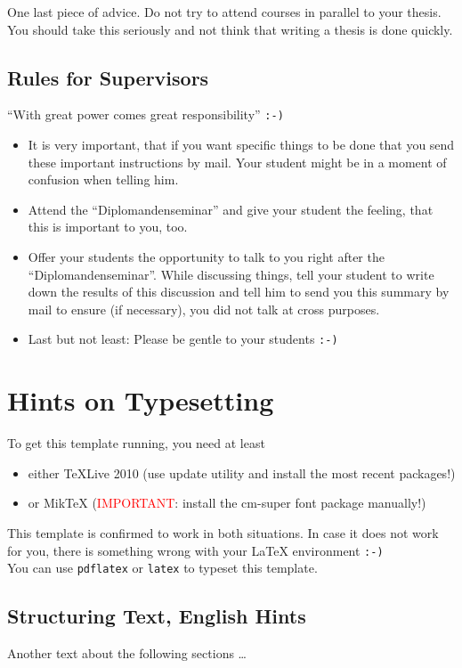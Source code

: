 One last piece of advice. Do not try to attend courses in parallel to your thesis. You should take this seriously and not think that writing a thesis is done quickly.

\subsection{Rules for Supervisors}
\enquote{With great power comes great responsibility} \texttt{:-)}

\begin{itemize}
\item It is very important, that if you want specific things to be done that you send these important instructions by mail. Your student might be in a moment of confusion when telling him.
\item Attend the \enquote{Diplomandenseminar} and give your student the feeling, that this is important to you, too.
\item Offer your students the opportunity to talk to you right after the \enquote{Diplomandenseminar}. While discussing things, tell your student to write down the results of this discussion and tell him to send you this summary by mail to ensure (if necessary), you did not talk at cross purposes.
\item Last but not least: Please be gentle to your students \texttt{:-)}
\end{itemize}

\section{Hints on Typesetting}
To get this template running, you need at least

\begin{itemize}
\item either TeXLive 2010 (use update utility and install the most recent packages!)
\item or MikTeX (\textcolor{red}{IMPORTANT}: install the cm-super font package manually!)
\end{itemize}

This template is confirmed to work in both situations. In case it does not work for you, there is something wrong with your \LaTeX\/ environment \texttt{:-)}\\

You can use \texttt{pdflatex} or \texttt{latex} to typeset this template.

\subsection{Structuring Text, English Hints}
Another text about the following sections \dots

